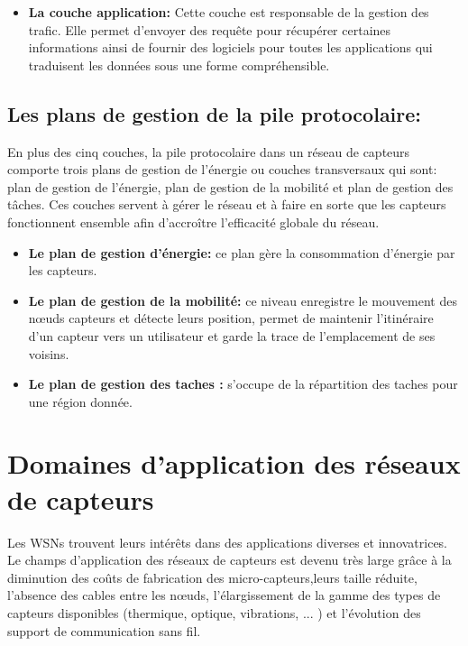 \begin{itemize}
	\item \textbf{La couche application: }Cette couche est responsable de la gestion des trafic. Elle permet d’envoyer des requête pour récupérer certaines informations ainsi de fournir des logiciels pour toutes les applications qui traduisent les données sous une forme compréhensible. 

\end{itemize}


\subsection{Les plans de gestion de la pile protocolaire:}
En plus des cinq couches, la pile protocolaire dans un réseau de capteurs comporte trois plans de gestion de l’énergie ou couches transversaux qui sont: plan de gestion de l’énergie, plan de gestion de la mobilité et plan de gestion des tâches. 
Ces couches servent à gérer le réseau et à faire en sorte que les capteurs fonctionnent ensemble afin d'accroître l'efficacité globale du réseau\cite{akyildiz2002wireless}.

\begin{itemize}
	\item \textbf{Le plan de gestion d’énergie: }ce plan gère la consommation d’énergie par les capteurs.
	\item \textbf{Le plan de gestion de la mobilité: }ce niveau enregistre le mouvement des nœuds capteurs et détecte leurs position, permet de maintenir l’itinéraire d’un capteur vers un utilisateur et garde la trace de l’emplacement de ses voisins.
	\item \textbf{Le plan de gestion des taches : }s’occupe de la répartition des taches pour une région donnée.
\end{itemize}


\section{Domaines d'application des réseaux de capteurs}
Les WSNs trouvent leurs intérêts dans des applications diverses et innovatrices. Le champs d’application des réseaux de capteurs est devenu très large grâce à la diminution des coûts de fabrication des micro-capteurs,leurs taille réduite, l’absence des cables entre les nœuds,  l'élargissement de la gamme des types de capteurs disponibles (thermique, optique, vibrations, ... ) et l'évolution des support de communication sans fil.

